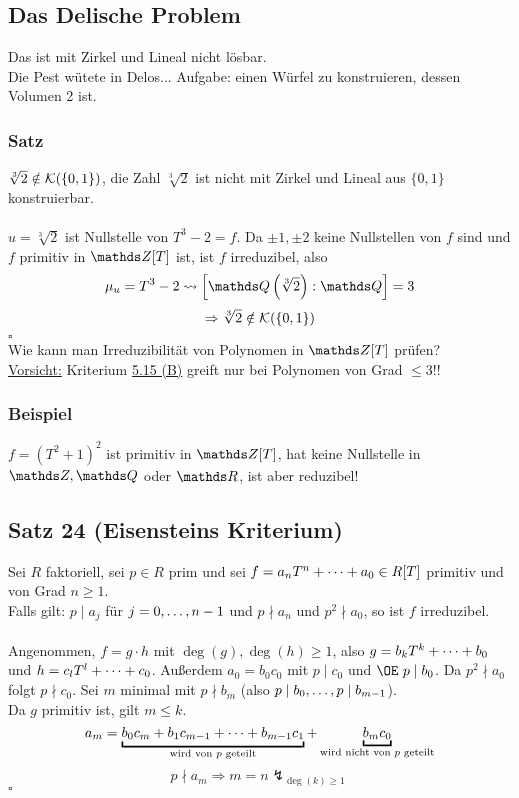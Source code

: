\subsection{Das Delische Problem}
\label{sub:delisches_problem}
Das  ist mit Zirkel und Lineal nicht lösbar.\\
Die Pest wütete in Delos... Aufgabe: einen Würfel zu konstruieren, dessen Volumen 2 ist.

\subsubsection*{Satz}
$\sqrt[3]{2}\notin \mathcal{K}(\{0,1\})$, die Zahl $\sqrt[3]{2}$ ist nicht mit Zirkel und Lineal aus $\{0,1\}$ konstruierbar.\\

\\
$u=\sqrt[3]{2}$ ist Nullstelle von $T^3-2=f$.
Da $\pm1,\pm2$ keine Nullstellen von $f$ sind und $f$ primitiv in $\Z[T]$ ist, ist $f$ irreduzibel, also
\[
\mu_u=T^3-2\rightsquigarrow \left[\Q\enbrace{\sqrt[3]{2}}:\Q\right]=3
\]
\[
\Rightarrow \sqrt[3]{2}\notin \mathcal{K}(\{0,1\})
\]
\hfill $\square$\\

Wie kann man Irreduzibilität von Polynomen in $\Z[T]$ prüfen?\\
\uline{Vorsicht:} Kriterium \hyperref[sub:bemerkung]{5.15 (B)} greift nur bei Polynomen von Grad $\le3$!!\\

\subsubsection*{Beispiel}
$f=(T^2+1)^2$ ist primitiv in $\Z[T]$, hat keine Nullstelle in $\Z,\Q$ oder $\R$, ist aber reduzibel!

\subsection{Satz 24 (Eisensteins Kriterium)}
\label{sub:satz_24}
Sei $R$ faktoriell, sei $p\in R$ prim und sei $f=a_nT^n+ \dots +a_0\in R[T]$ primitiv und von Grad $n\ge 1$.\\
Falls gilt: $p\mid a_j$ für $j=0, \dots ,n-1$ und $p\nmid a_n$ und $p^2\nmid a_0$, so ist $f$ irreduzibel.\\

\\
Angenommen, $f=g\cdot h$ mit $\deg(g),\deg(h)\ge 1$, also $g=b_kT^k+ \dots +b_0$ und $h=c_lT^l+ \dots +c_0$. 
Außerdem $a_0=b_0c_0$ mit $p\mid c_0$ und $\OE~p\mid b_0$.
Da $p^2\nmid a_0$ folgt $p\nmid c_0$.
Sei $m$ minimal mit $p\nmid b_m$ (also $p\mid b_0, \dots ,p\mid b_{m-1}$).\\
Da $g$ primitiv ist, gilt $m\le k$.
\[
a_m=\underbracket{b_0c_m+b_1c_{m-1}\dt{+}b_{m-1}c_1}_{\text{wird von }p\text{ geteilt}}+\underbracket{b_mc_0}_{\text{wird nicht von }p \text{ geteilt}}
\]
\[
p\nmid a_m\Rightarrow m=n\lightning_{\deg(k)\ge 1}
\]
\hfill $\square$\\

